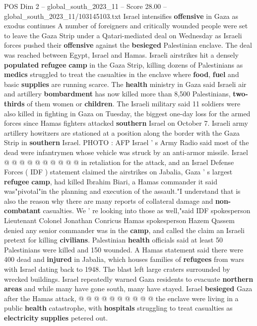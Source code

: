 \begin{textsample}{POS Dim 2 – global\_south\_2023\_11 – Score 28.00 – global\_south\_2023\_11/103145103.txt}  \label{ex:f2_pos_100}
Israel intensifies \textbf{offensive} in Gaza as exodus continues A number of foreigners and critically wounded people were set to leave the Gaza Strip under a Qatari-mediated deal on Wednesday as Israeli forces pushed their \textbf{offensive} against the \textbf{besieged} Palestinian enclave.
The deal was reached between Egypt, Israel and Hamas.
Israeli airstrikes hit a densely \textbf{populated} \textbf{refugee} \textbf{camp} in the Gaza Strip, killing dozens of Palestinians as \textbf{medics} struggled to treat the casualties in the enclave where \textbf{food}, \textbf{fuel} and basic \textbf{supplies} are running scarce.
The \textbf{health} ministry in Gaza said Israeli air and artillery \textbf{bombardment} has now killed more than 8,500 Palestinians, \textbf{two-thirds} of them women or \textbf{children}.
The Israeli military said 11 soldiers were also killed in fighting in Gaza on Tuesday, the biggest one-day loss for the armed forces since Hamas fighters attacked \textbf{southern} Israel on October 7.
Israeli army artillery howitzers are stationed at a position along the border with the Gaza Strip in \textbf{southern} Israel.
PHOTO : AFP Israel ' s Army Radio said most of the dead were infantrymen whose vehicle was struck by an anti-armor missile.
Israel @ @ @ @ @ @ @ @ @ @ in retaliation for the attack, and an Israel Defense Forces ( IDF ) statement claimed the airstrikes on Jabalia, Gaza ' s largest \textbf{refugee} \textbf{camp}, had killed Ibrahim Biari, a Hamas commander it said was"pivotal"in the planning and execution of the assault."I understand that is also the reason why there are many reports of collateral damage and \textbf{non-combatant} casualties.
We ' re looking into those as well,"said IDF spokesperson Lieutenant Colonel Jonathan Conricus Hamas spokesperson Hazem Qassem denied any senior commander was in the \textbf{camp}, and called the claim an Israeli pretext for killing \textbf{civilians}.
Palestinian \textbf{health} officials said at least 50 Palestinians were killed and 150 wounded.
A Hamas statement said there were 400 dead and \textbf{injured} in Jabalia, which houses families of \textbf{refugees} from wars with Israel dating back to 1948.
The blast left large craters surrounded by wrecked buildings.
Israel repeatedly warned Gaza residents to evacuate \textbf{northern} \textbf{areas} and while many have gone south, many have stayed.
Israel \textbf{besieged} Gaza after the Hamas attack, @ @ @ @ @ @ @ @ @ @ the enclave were living in a public \textbf{health} catastrophe, with \textbf{hospitals} struggling to treat casualties as \textbf{electricity} \textbf{supplies} petered out.

\end{textsample}
